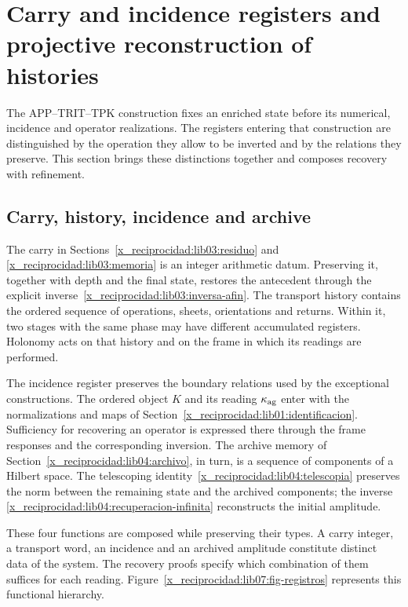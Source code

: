 \chapter{Carry and incidence registers and projective reconstruction of histories}
\label{x_reciprocidad:lib07:armonizacion}
The APP--TRIT--TPK construction fixes an enriched state before
its numerical, incidence and operator realizations. The registers
entering that construction are distinguished by the operation
they allow to be inverted and by the relations they preserve. This section
brings these distinctions together and composes recovery with refinement.

\section{Carry, history, incidence and archive}
The carry in Sections~\ref{x_reciprocidad:lib03:residuo} and
\ref{x_reciprocidad:lib03:memoria} is an integer arithmetic datum. Preserving it,
together with depth and the final state, restores the antecedent
through the explicit inverse~\eqref{x_reciprocidad:lib03:inversa-afin}.
The transport history contains the ordered sequence of operations,
sheets, orientations and returns. Within it, two stages with the same phase
may have different accumulated registers. Holonomy acts on
that history and on the frame in which its readings are performed.

The incidence register preserves the boundary relations
used by the exceptional constructions. The ordered object \(K\)
and its reading \(\kappa_{\rm ag}\) enter with the normalizations
and maps of Section~\ref{x_reciprocidad:lib01:identificacion}.
Sufficiency for recovering an operator is expressed there through
the frame responses and the corresponding inversion.
The archive memory of Section~\ref{x_reciprocidad:lib04:archivo}, in turn,
is a sequence of components of a Hilbert space. The telescoping
identity~\eqref{x_reciprocidad:lib04:telescopia} preserves the norm between the
remaining state and the archived components; the inverse
\eqref{x_reciprocidad:lib04:recuperacion-infinita} reconstructs the initial amplitude.

These four functions are composed while preserving their types.
A carry integer, a transport word, an incidence
and an archived amplitude constitute distinct data of the system.
The recovery proofs specify which combination of them
suffices for each reading. Figure~\ref{x_reciprocidad:lib07:fig-registros}
represents this functional hierarchy.

